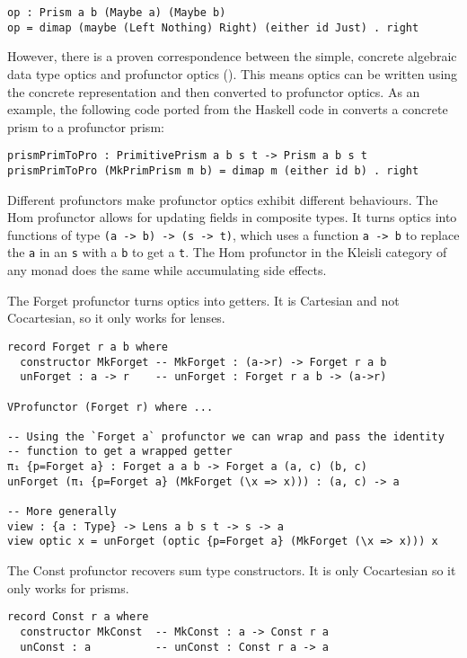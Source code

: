 \documentclass[11pt]{report}
\begin{document}
\begin{spacing}{1.15}
\begin{verbatim}
op : Prism a b (Maybe a) (Maybe b)
op = dimap (maybe (Left Nothing) Right) (either id Just) . right
\end{verbatim}

However, there is a proven correspondence between the simple, concrete algebraic data type optics and profunctor optics (\cite{boisseau2018yoneda}). This means optics can be written using the concrete representation and then converted to profunctor optics. As an example, the following code ported from the Haskell code in \cite{pickering2017profunctor} converts a concrete prism to a profunctor prism:

\begin{verbatim}
prismPrimToPro : PrimitivePrism a b s t -> Prism a b s t
prismPrimToPro (MkPrimPrism m b) = dimap m (either id b) . right
\end{verbatim}

Different profunctors make profunctor optics exhibit different behaviours. The Hom profunctor allows for updating fields in composite types. It turns optics into functions of type \texttt{(a -> b) -> (s -> t)}, which uses a function \texttt{a -> b} to replace the \texttt{a} in an \texttt{s} with a \texttt{b} to get a \texttt{t}. The Hom profunctor in the Kleisli category of any monad does the same while accumulating side effects.

The Forget profunctor turns optics into getters. It is Cartesian and not Cocartesian, so it only works for lenses.

\begin{verbatim}
record Forget r a b where
  constructor MkForget -- MkForget : (a->r) -> Forget r a b
  unForget : a -> r    -- unForget : Forget r a b -> (a->r)

VProfunctor (Forget r) where ...

-- Using the `Forget a` profunctor we can wrap and pass the identity
-- function to get a wrapped getter
π₁ {p=Forget a} : Forget a a b -> Forget a (a, c) (b, c)
unForget (π₁ {p=Forget a} (MkForget (\x => x))) : (a, c) -> a

-- More generally
view : {a : Type} -> Lens a b s t -> s -> a
view optic x = unForget (optic {p=Forget a} (MkForget (\x => x))) x
\end{verbatim}

The Const profunctor recovers sum type constructors. It is only Cocartesian so it only works for prisms.

\begin{verbatim}
record Const r a where
  constructor MkConst  -- MkConst : a -> Const r a
  unConst : a          -- unConst : Const r a -> a


\end{verbatim}
\end{spacing}
\end{document}
